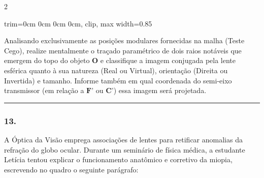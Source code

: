 \documentclass[twoside, 10pt, a4paper]{article}
\newlength{\espacoPreQuestao}\setlength{\espacoPreQuestao}{0.1cm}
\newlength{\espacoQuestao}\setlength{\espacoQuestao}{0.2cm}
\newcommand{\larguraTikz}{0.85\linewidth}
\begin{document}
\begin{multicols*}{2}
\begin{center}
\begin{adjustbox}{trim=0cm 0cm 0cm 0cm, clip, max width=\larguraTikz}
\end{adjustbox}
\end{center}
Analisando exclusivamente as posições modulares fornecidas na malha (Teste Cego), realize mentalmente o traçado paramétrico de dois raios notáveis que emergem do topo do objeto \textbf{O} e classifique a imagem conjugada pela lente esférica quanto à sua natureza (Real ou Virtual), orientação (Direita ou Invertida) e tamanho. Informe também em qual coordenada do semi-eixo transmissor (em relação a $ \textbf{F'} $ ou $ \textbf{C'} $) essa imagem será projetada.
\par\vspace{\espacoQuestao}

\noindent\textcolor{CorLinha}{\rule{\linewidth}{0.5pt}} 
\par\vspace{\espacoPreQuestao}
\subsubsection*{13.} A Óptica da Visão emprega associações de lentes para retificar anomalias da refração do globo ocular. Durante um seminário de física médica, a estudante Letícia tentou explicar o funcionamento anatômico e corretivo da miopia, escrevendo no quadro o seguinte parágrafo:


\end{multicols*}
\end{document}
